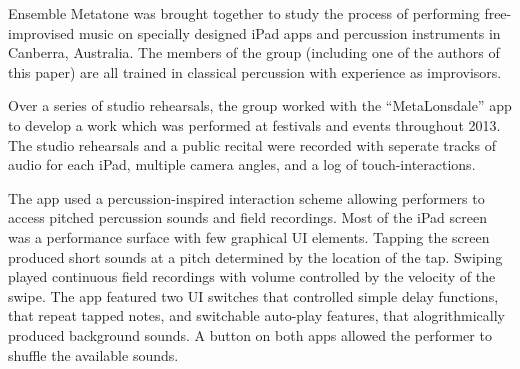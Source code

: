 \documentclass[graybox]{svmult}
\begin{document}
Ensemble Metatone was brought together to study the process of
performing free-improvised music on specially designed iPad apps and
percussion instruments in Canberra, Australia. The members of the
group (including one of the authors of this paper) are all trained in
classical percussion with experience as improvisors.

Over a series of studio rehearsals, the group worked with the
``MetaLonsdale'' app to develop a work which was performed at
festivals and events throughout 2013. The studio rehearsals and a
public recital were recorded with seperate tracks of audio for each
iPad, multiple camera angles, and a log of touch-interactions.

The app used a percussion-inspired interaction scheme allowing
performers to access pitched percussion sounds and field recordings.
Most of the iPad screen was a performance surface with few graphical
UI elements. Tapping the screen produced short sounds at a pitch
determined by the location of the tap. Swiping played continuous field
recordings with volume controlled by the velocity of the swipe. The
app featured two UI switches that controlled simple delay functions,
that repeat tapped notes, and switchable auto-play features, that
alogrithmically produced background sounds. A button on both apps
allowed the performer to shuffle the available sounds.
\end{document}
